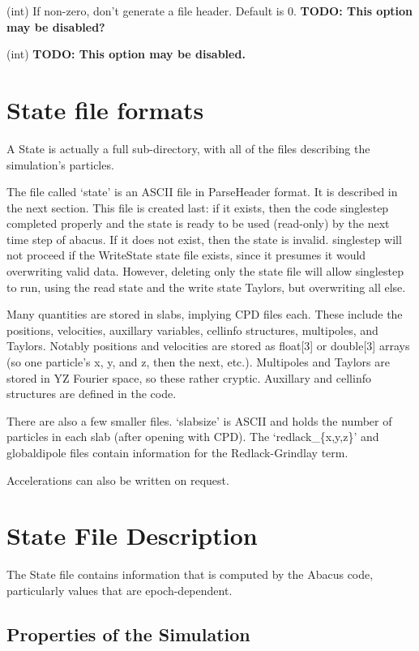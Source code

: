 \documentclass[11pt,preprint]{aastex}
\newcommand{\param}[2]{\medskip\noindent{\bf #1:} (#2) }
\newcommand{\todo}[1]{{\bf TODO: #1}}
\begin{document}
\param{ZD\_qnoheader}{int} If non-zero, don't generate a file header.
Default is 0.  
\todo{This option may be disabled?}

\param{ZD\_qvelocity}{int} 
\todo{This option may be disabled.}


\clearpage

\section{State file formats}

A State is actually a full sub-directory, with all of the files
describing the simulation's particles.

The file called `state' is an ASCII file in ParseHeader format.  It
is described in the next section.  This file is created last: if
it exists, then the code singlestep completed properly and the state
is ready to be used (read-only) by the next time step of abacus.
If it does not exist, then the state is invalid.  singlestep will
not proceed if the WriteState state file exists, since it presumes
it would overwriting valid data.  However, deleting only the state
file will allow singlestep to run, using the read state and the
write state Taylors, but overwriting all else.

Many quantities are stored in slabs, implying CPD files each.  These
include the positions, velocities, auxillary variables, cellinfo
structures, multipoles, and Taylors.  Notably positions and velocities
are stored as float[3] or double[3] arrays (so one particle's x,
y, and z, then the next, etc.).  Multipoles and Taylors are stored
in YZ Fourier space, so these rather cryptic.  Auxillary and cellinfo
structures are defined in the code.

There are also a few smaller files.  `slabsize' is ASCII and holds
the number of particles in each slab (after opening with CPD).  The
`redlack\_\{x,y,z\}' and globaldipole files contain information for
the Redlack-Grindlay term.

Accelerations can also be written on request.

\section{State File Description}

The State file contains information that is computed by the Abacus
code, particularly values that are epoch-dependent.

\subsection{Properties of the Simulation}
\end{document}
